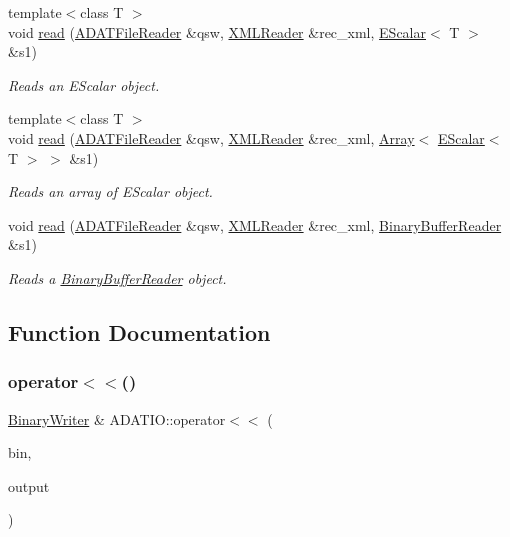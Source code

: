 \begin{DoxyCompactItemize}
{\footnotesize template$<$class T $>$ }\\void \mbox{\hyperlink{group__qio_ga3dd8ea4aebc2b69c0ad2996743816341}{read}} (\mbox{\hyperlink{classADATIO_1_1ADATFileReader}{A\+D\+A\+T\+File\+Reader}} \&qsw, \mbox{\hyperlink{classADATXML_1_1XMLReader}{X\+M\+L\+Reader}} \&rec\+\_\+xml, \mbox{\hyperlink{classENSEM_1_1EScalar}{E\+Scalar}}$<$ T $>$ \&s1)
\begin{DoxyCompactList}\small\item\em Reads an E\+Scalar object. \end{DoxyCompactList}\item 
{\footnotesize template$<$class T $>$ }\\void \mbox{\hyperlink{group__qio_ga2505d6fa25fdce3f9d953179afc3532e}{read}} (\mbox{\hyperlink{classADATIO_1_1ADATFileReader}{A\+D\+A\+T\+File\+Reader}} \&qsw, \mbox{\hyperlink{classADATXML_1_1XMLReader}{X\+M\+L\+Reader}} \&rec\+\_\+xml, \mbox{\hyperlink{classXMLArray_1_1Array}{Array}}$<$ \mbox{\hyperlink{classENSEM_1_1EScalar}{E\+Scalar}}$<$ T $>$ $>$ \&s1)
\begin{DoxyCompactList}\small\item\em Reads an array of E\+Scalar object. \end{DoxyCompactList}\item 
void \mbox{\hyperlink{group__qio_gad349a61627372c07f82a004b876423b8}{read}} (\mbox{\hyperlink{classADATIO_1_1ADATFileReader}{A\+D\+A\+T\+File\+Reader}} \&qsw, \mbox{\hyperlink{classADATXML_1_1XMLReader}{X\+M\+L\+Reader}} \&rec\+\_\+xml, \mbox{\hyperlink{classADATIO_1_1BinaryBufferReader}{Binary\+Buffer\+Reader}} \&s1)
\begin{DoxyCompactList}\small\item\em Reads a \mbox{\hyperlink{classADATIO_1_1BinaryBufferReader}{Binary\+Buffer\+Reader}} object. \end{DoxyCompactList}\end{DoxyCompactItemize}


\subsection{Function Documentation}
\mbox{\label{namespaceADATIO_a10c403177088d104f13bd52cefae2a84}} 
\subsubsection{\texorpdfstring{operator$<$$<$()}{operator<<()}\hspace{0.1cm}{\footnotesize\ttfamily [1/12]}}
{\footnotesize\ttfamily \mbox{\hyperlink{classADATIO_1_1BinaryWriter}{Binary\+Writer}} \& A\+D\+A\+T\+I\+O\+::operator$<$$<$ (\begin{DoxyParamCaption}\item[{\mbox{\hyperlink{classADATIO_1_1BinaryWriter}{Binary\+Writer}} \&}]{bin,  }\item[{const std\+::string \&}]{output }\end{DoxyParamCaption})}


